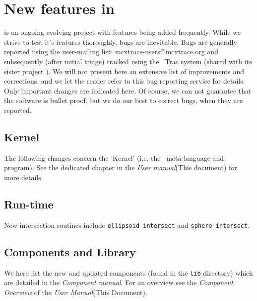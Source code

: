 
\chapter{New features in \MCX \version}
\label{c:changes}

\MCX is an ongoing evolving project with features being added frequently. While we strive to test it's features thoroughly, bugs
are inevitable. Bugs are generally reported using the user-mailing list: mcxtrace-users@mcxtrace.org and subsequently (after initial triage)
tracked using the \MCX\ Trac system \cite{mccode_trac_webpage}
(shared with its sister project \MCS). We will not present here an extensive
list of improvements and corrections, and we let the reader refer to this bug reporting service
for details. Only important changes are indicated here.
Of course, we can not guarantee that the software is bullet proof, but we do our best to correct bugs, when they are reported.


\section{Kernel}
\label{s:new-features:kernel}

The following changes concern the 'Kernel' (i.e. the \MCX\ meta-language and program). See the dedicated chapter in the \textit{User manual}(This document) for more details.

\section{Run-time}
\label{s:new-features:run-time}
New intersection routines include \verb+ellipsoid_intersect+ and \verb+sphere_intersect+.


\section{Components and Library}
\label{s:new-features:components}
 
We here list the new and updated components (found in the \MCX \verb+lib+ directory)
which are detailed in the \textit{Component manual}. For an overview see the \textit{Component Overview} of the \textit{User Manual}(This Document).
